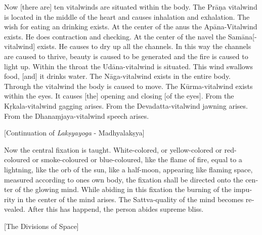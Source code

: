 \begin{otherlanguage}{english}
\begin{tlate}
 Now [there are] ten vitalwinds are situated within the body. The Prāṇa vitalwind is located in the middle of the heart and causes inhalation and exhalation. The wish for eating an drinking exists. At the center of the anus the Apāna-Vitalwind exists. He does contraction and checking. At the center of the navel the Samāna[-vitalwind] exists. He causes to dry up all the channels. In this way the channels are caused to thrive, beauty is caused to be generated and the fire is caused to light up. Within the throat the Udāna-vitalwind is situated. This wind swallows food, [and] it drinks water. The Nāga-vitalwind exists in the entire body. Through the vitalwind the body is caused to move. The Kūrma-vitalwind exists within the eyes. It causes [the] opening and closing [of the eyes]. From the Kṛkala-vitalwind gagging arises. From the Devadatta-vitalwind jawning arises. From the Dhanaṃjaya-vitalwind speech arises.
\end{tlate}
\begin{tlate}
\bigskip
 \centerline{\textrm{\small{[Continuation of \textit{Lakṣyayoga} - Madhyalakṣya]}}}
 \bigskip
Now the central fixation is taught. White-colored, or yellow-colored or red-coloured or smoke-coloured or blue-coloured, like the flame of fire, equal to a lightning, like the orb of the sun, like a half-moon, appearing like flaming space, measured according to ones own body, the fixation shall be directed onto the center of the glowing mind. While abiding in this fixation the burning of the impurity in the center of the mind arises. The Sattva-quality of the mind becomes revealed. After this has happend, the person abides supreme bliss.  
\end{tlate}
\begin{tlate}
 \bigskip
 \centerline{\textrm{\small{[The Divisions of Space]}}}
 \bigskip

\end{tlate}
\end{otherlanguage}
